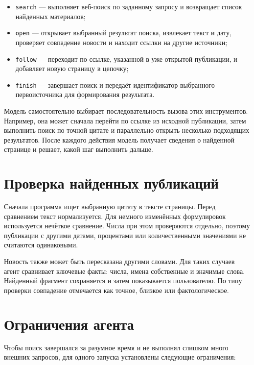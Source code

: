\documentclass[11pt,a4paper]{article}
\begin{document}
\begin{itemize}[leftmargin=1.8em]
    \item \texttt{search} --- выполняет веб-поиск по заданному запросу и возвращает список найденных материалов;
    \item \texttt{open} --- открывает выбранный результат поиска, извлекает текст и дату, проверяет совпадение новости и находит ссылки на другие источники;
    \item \texttt{follow} --- переходит по ссылке, указанной в уже открытой публикации, и добавляет новую страницу в цепочку;
    \item \texttt{finish} --- завершает поиск и передаёт идентификатор выбранного первоисточника для формирования результата.
\end{itemize}

Модель самостоятельно выбирает последовательность вызова этих инструментов. Например, она может сначала перейти по ссылке из исходной публикации, затем выполнить поиск по точной цитате и параллельно открыть несколько подходящих результатов. После каждого действия модель получает сведения о найденной странице и решает, какой шаг выполнить дальше.

\section*{Проверка найденных публикаций}

Сначала программа ищет выбранную цитату в тексте страницы. Перед сравнением текст нормализуется. Для немного изменённых формулировок используется нечёткое сравнение. Числа при этом проверяются отдельно, поэтому публикации с другими датами, процентами или количественными значениями не считаются одинаковыми.

Новость также может быть пересказана другими словами. Для таких случаев агент сравнивает ключевые факты: числа, имена собственные и значимые слова. Найденный фрагмент сохраняется и затем показывается пользователю. По типу проверки совпадение отмечается как точное, близкое или фактологическое.

\section*{Ограничения агента}

Чтобы поиск завершался за разумное время и не выполнял слишком много внешних запросов, для одного запуска установлены следующие ограничения:
\end{document}
